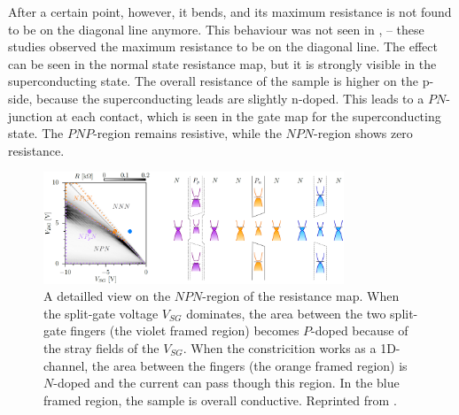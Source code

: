 After a certain point, however, it bends, and its maximum resistance is not found to be on the diagonal line anymore. This behaviour was not seen in  \cite{Oostinga2008}, \cite{Taychatanapat2010} -- these studies observed the maximum resistance to be on the diagonal line. The effect can be seen in the normal state resistance map, but it is strongly visible in the superconducting state. The overall resistance of the sample is higher on the p-side, because the superconducting leads are slightly n-doped. This leads to a $PN$-junction at each contact, which is seen in the gate map for the superconducting state. The $PNP$-region remains resistive, while the $NPN$-region shows zero resistance.

\begin{figure}
\centering
\includegraphics[width=0.8\textwidth]{figure/experiment/npn-region-detail}
\caption{A detailled view on the $NPN$-region of the resistance map. When the split-gate voltage $V_{SG}$ dominates, the area between the two split-gate fingers (the violet framed region) becomes $P$-doped because of the stray fields of the $V_{SG}$. When the constricition works as a 1D-channel, the area between the fingers (the orange framed region) is $N$-doped and the current can pass though this region. In the blue framed region, the sample is overall conductive. Reprinted from \cite{Kraft2017}.}\label{fig:npn-regions-gates}
\end{figure}

